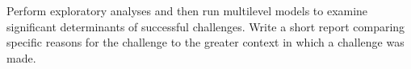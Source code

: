 \documentclass[
]{krantz}
\begin{document}
\begin{enumerate}
  Perform exploratory analyses and then run multilevel models to examine significant determinants of successful challenges. Write a short report comparing specific reasons for the challenge to the greater context in which a challenge was made.
\end{enumerate}

  

\backmatter
\printindex
\end{document}
